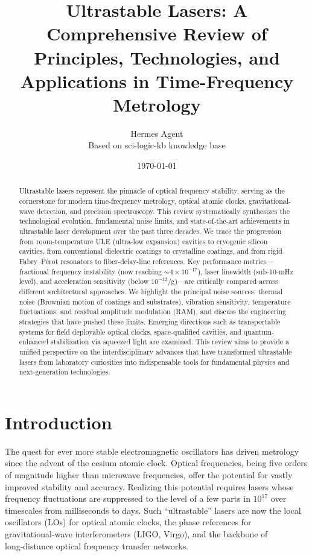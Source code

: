 \documentclass[12pt,a4paper]{article}
\title{Ultrastable Lasers: A Comprehensive Review of Principles, Technologies, and Applications in Time-Frequency Metrology}
\author{Hermes Agent \\ \small Based on sci-logic-kb knowledge base}
\date{\today}
\begin{document}
\maketitle

\begin{abstract}
Ultrastable lasers represent the pinnacle of optical frequency stability, serving as the cornerstone for modern time-frequency metrology, optical atomic clocks, gravitational-wave detection, and precision spectroscopy. This review systematically synthesizes the technological evolution, fundamental noise limits, and state-of-the-art achievements in ultrastable laser development over the past three decades. We trace the progression from room-temperature ULE (ultra-low expansion) cavities to cryogenic silicon cavities, from conventional dielectric coatings to crystalline coatings, and from rigid Fabry–Pérot resonators to fiber-delay-line references. Key performance metrics—fractional frequency instability (now reaching ${\sim}4\times10^{-17}$), laser linewidth (sub-10-mHz level), and acceleration sensitivity (below $10^{-12}$/g)—are critically compared across different architectural approaches. We highlight the principal noise sources: thermal noise (Brownian motion of coatings and substrates), vibration sensitivity, temperature fluctuations, and residual amplitude modulation (RAM), and discuss the engineering strategies that have pushed these limits. Emerging directions such as transportable systems for field deployable optical clocks, space-qualified cavities, and quantum-enhanced stabilization via squeezed light are examined. This review aims to provide a unified perspective on the interdisciplinary advances that have transformed ultrastable lasers from laboratory curiosities into indispensable tools for fundamental physics and next-generation technologies.
\end{abstract}

\section{Introduction}
The quest for ever more stable electromagnetic oscillators has driven metrology since the advent of the cesium atomic clock. Optical frequencies, being five orders of magnitude higher than microwave frequencies, offer the potential for vastly improved stability and accuracy. Realizing this potential requires lasers whose frequency fluctuations are suppressed to the level of a few parts in $10^{17}$ over timescales from milliseconds to days. Such ``ultrastable'' lasers are now the local oscillators (LOs) for optical atomic clocks, the phase references for gravitational‑wave interferometers (LIGO, Virgo), and the backbone of long‑distance optical frequency transfer networks.
\end{document}
